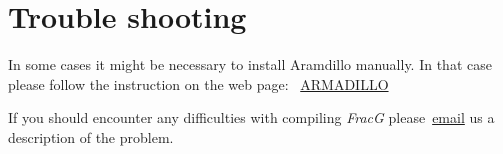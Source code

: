 \documentclass[10pt,a4paper]{article}
\begin{document}
\section{Trouble shooting}
In some cases it might be necessary to install Aramdillo manually. In that case please follow the instruction on the web page:
~\href{http://arma.sourceforge.net/download.html}{ARMADILLO}

If you should encounter any difficulties with compiling \textit{FracG} please~\href{mailto:uli.kelka@csiro.au}{email} us a description of the problem.

\vspace*{\fill}
 

\end{document}
